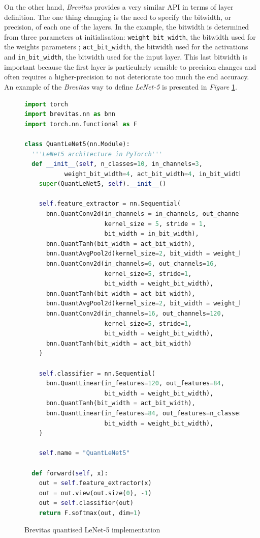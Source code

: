 On the other hand, \emph{Brevitas} provides a very similar API in terms of layer definition. The one thing changing is the need to specify the bitwidth, or precision, of each one of the layers. In the example, the bitwidth is determined from three parameters at initialisation: \texttt{weight\_bit\_width}, the bitwidth used for the weights parameters ; \texttt{act\_bit\_width}, the bitwidth used for the activations and \texttt{in\_bit\_width}, the bitwidth used for the input layer. This last bitwidth is important because the first layer is particularly sensible to precision changes and often requires a higher-precision to not deteriorate too much the end accuracy. An example of the \emph{Brevitas} way to define \emph{LeNet-5} is presented in \emph{Figure} \ref{fig:LeNetBrevitas}.


\begin{figure}[htbp]
\centering
\begin{lstlisting}[language=Python]
import torch
import brevitas.nn as bnn
import torch.nn.functional as F

class QuantLeNet5(nn.Module):
  '''LeNet5 architecture in PyTorch'''
  def __init__(self, n_classes=10, in_channels=3,
           weight_bit_width=4, act_bit_width=4, in_bit_width=8):
    super(QuantLeNet5, self).__init__()

    self.feature_extractor = nn.Sequential(
      bnn.QuantConv2d(in_channels = in_channels, out_channels = 6,
                      kernel_size = 5, stride = 1,
                      bit_width = in_bit_width),
      bnn.QuantTanh(bit_width = act_bit_width),
      bnn.QuantAvgPool2d(kernel_size=2, bit_width = weight_bit_width),
      bnn.QuantConv2d(in_channels=6, out_channels=16,
                      kernel_size=5, stride=1,
                      bit_width = weight_bit_width),
      bnn.QuantTanh(bit_width = act_bit_width),
      bnn.QuantAvgPool2d(kernel_size=2, bit_width = weight_bit_width),
      bnn.QuantConv2d(in_channels=16, out_channels=120,
                      kernel_size=5, stride=1,
                      bit_width = weight_bit_width),
      bnn.QuantTanh(bit_width = act_bit_width)
    )

    self.classifier = nn.Sequential(
      bnn.QuantLinear(in_features=120, out_features=84,
                      bit_width = weight_bit_width),
      bnn.QuantTanh(bit_width = act_bit_width),
      bnn.QuantLinear(in_features=84, out_features=n_classes,
                      bit_width = weight_bit_width),
    )

    self.name = "QuantLeNet5"

  def forward(self, x):
    out = self.feature_extractor(x)
    out = out.view(out.size(0), -1)
    out = self.classifier(out)
    return F.softmax(out, dim=1)
\end{lstlisting}
\caption[LeNetBrevitas]{Brevitas quantised LeNet-5 \cite{LeCun1998} implementation}
	\label{fig:LeNetBrevitas}
\end{figure}


